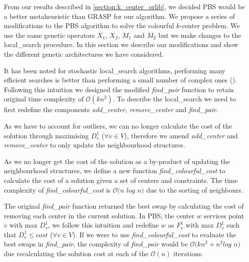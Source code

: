 From our results described in \cref{section:k_center_orlib}, we decided PBS would be a better metaheuristic than GRASP for our algorithm. We propose a series of modifications to the PBS algorithm to solve the colourful $k$-center problem. We use the same genetic operators $X_1$, $X_2$, $M_1$ and $M_2$ but we make changes to the \gls{local_search} procedure. In this section we describe our modifications and show the different genetic architectures we have considered.

It has been noted for stochastic \gls{local_search} algorithms, performing many efficient searches is better than performing a small number of complex ones (\cite{pullan_memetic_2008}). Following this intuition we designed the modified \emph{find\_pair} function to retain original time complexity of $\mathcal{O}(kn^2)$. To describe the \gls{local_search} we need to first redefine the components \emph{add\_center}, \emph{remove\_center} and \emph{find\_pair}.

As we have to account for outliers, we can no longer calculate the cost of the solution through maximising $D^1_v$ ($\forall v\in V$), therefore we amend \emph{add\_center} and \emph{remove\_center} to only update the neighbourhood structures.

\begin{minipage}{0.48\textwidth}
    
\end{minipage}
\hspace{0.02\textwidth}
\begin{minipage}{0.48\textwidth}
    
\end{minipage}

As we no longer get the cost of the solution as a by-product of updating the neighbourhood structures, we define a new function \emph{find\_colourful\_cost} to calculate the cost of a solution given a set of centers and constraints. The time complexity of \emph{find\_colourful\_cost} is $\mathcal{O}(n$ $log$ $n)$ due to the sorting of neighbours.


\newpage
The original \emph{find\_pair} function returned the best swap by calculating the cost of removing each center in the current solution. In PBS, the center $w$ services point $v$ with max $D^1_v$, we follow this intuition and redefine $w$ as $F^1_v$ with max $D^1_v$ such that $D^1_v\leq cost$ ($\forall v\in V$). If we were to use \emph{find\_colourful\_cost} to evaluate the best swaps in \emph{find\_pair}, the complexity of \emph{find\_pair} would be $\mathcal{O}(kn^2+n^2log$ $n)$ due recalculating the solution cost at each of the $\mathcal{O}(n)$ iterations.

